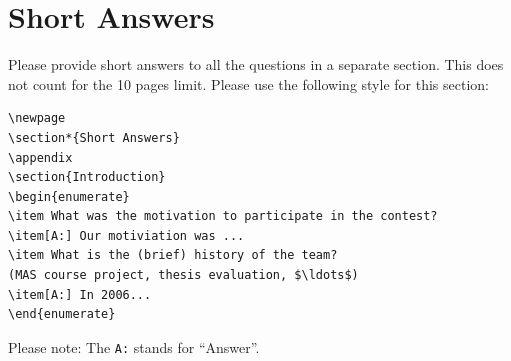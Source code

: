 \documentclass{llncs}
\begin{document}
\newpage
\section*{Short Answers}

Please provide short answers to all the questions in a separate section. This
does not count for the 10 pages limit. Please use the following style for this section:

\begin{verbatim}
\newpage
\section*{Short Answers}
\appendix
\section{Introduction}
\begin{enumerate}
\item What was the motivation to participate in the contest?
\item[A:] Our motiviation was ...
\item What is the (brief) history of the team?
(MAS course project, thesis evaluation, $\ldots$)
\item[A:] In 2006...
\end{enumerate}
\end{verbatim}
Please note: The \verb|A:| stands for "`Answer"'.

{}

\end{document}
